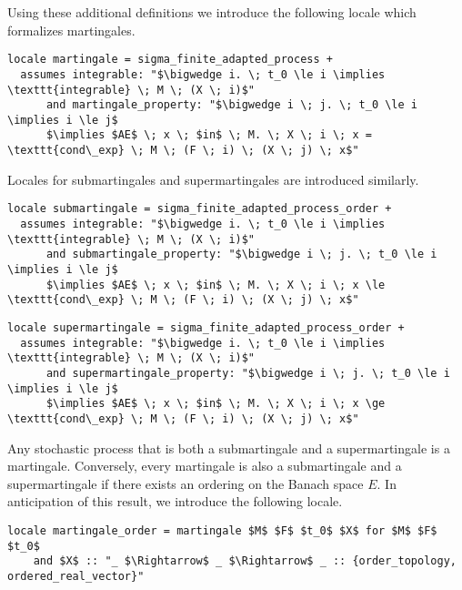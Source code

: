 Using these additional definitions we introduce the following locale which formalizes martingales.

\begin{isadefinition}
{\small
\begin{lstlisting}[style=isabelle]
locale martingale = sigma_finite_adapted_process +
  assumes integrable: "$\bigwedge i. \; t_0 \le i \implies \texttt{integrable} \; M \; (X \; i)$"
      and martingale_property: "$\bigwedge i \; j. \; t_0 \le i \implies i \le j$
	  $\implies $AE$ \; x \; $in$ \; M. \; X \; i \; x = \texttt{cond\_exp} \; M \; (F \; i) \; (X \; j) \; x$"
\end{lstlisting}
}
\end{isadefinition}

Locales for submartingales and supermartingales are introduced similarly.

\begin{isadefinition}
{\small
\begin{lstlisting}[style=isabelle]
locale submartingale = sigma_finite_adapted_process_order +
  assumes integrable: "$\bigwedge i. \; t_0 \le i \implies \texttt{integrable} \; M \; (X \; i)$"
      and submartingale_property: "$\bigwedge i \; j. \; t_0 \le i \implies i \le j$
	  $\implies $AE$ \; x \; $in$ \; M. \; X \; i \; x \le \texttt{cond\_exp} \; M \; (F \; i) \; (X \; j) \; x$"
\end{lstlisting}
}
\end{isadefinition}

\begin{isadefinition}
{\small
\begin{lstlisting}[style=isabelle]
locale supermartingale = sigma_finite_adapted_process_order +
  assumes integrable: "$\bigwedge i. \; t_0 \le i \implies \texttt{integrable} \; M \; (X \; i)$"
      and supermartingale_property: "$\bigwedge i \; j. \; t_0 \le i \implies i \le j$
	  $\implies $AE$ \; x \; $in$ \; M. \; X \; i \; x \ge \texttt{cond\_exp} \; M \; (F \; i) \; (X \; j) \; x$"
\end{lstlisting}
}
\end{isadefinition}

Any stochastic process that is both a submartingale and a supermartingale is a martingale. Conversely, every martingale is also a submartingale and a supermartingale if there exists an ordering on the Banach space $E$. In anticipation of this result, we introduce the following locale.

\begin{isadefinition}
{\small
\begin{lstlisting}[style=isabelle]
locale martingale_order = martingale $M$ $F$ $t_0$ $X$ for $M$ $F$ $t_0$
	and $X$ :: "_ $\Rightarrow$ _ $\Rightarrow$ _ :: {order_topology, ordered_real_vector}"
\end{lstlisting}
}
\end{isadefinition}

